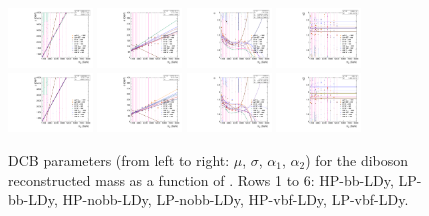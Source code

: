 \begin{figure}[htbp]
  \includegraphics[width=0.2\textwidth]{fig/analysisAppendix/paramSignalShape_allSig_MVV_HP_vbf_LDy_MEAN.pdf}
  \includegraphics[width=0.2\textwidth]{fig/analysisAppendix/paramSignalShape_allSig_MVV_HP_vbf_LDy_SIGMA.pdf}
  \includegraphics[width=0.2\textwidth]{fig/analysisAppendix/paramSignalShape_allSig_MVV_HP_vbf_LDy_ALPHA1.pdf}
  \includegraphics[width=0.2\textwidth]{fig/analysisAppendix/paramSignalShape_allSig_MVV_HP_vbf_LDy_ALPHA2.pdf}\\
  \includegraphics[width=0.2\textwidth]{fig/analysisAppendix/paramSignalShape_allSig_MVV_LP_vbf_LDy_MEAN.pdf}
  \includegraphics[width=0.2\textwidth]{fig/analysisAppendix/paramSignalShape_allSig_MVV_LP_vbf_LDy_SIGMA.pdf}
  \includegraphics[width=0.2\textwidth]{fig/analysisAppendix/paramSignalShape_allSig_MVV_LP_vbf_LDy_ALPHA1.pdf}
  \includegraphics[width=0.2\textwidth]{fig/analysisAppendix/paramSignalShape_allSig_MVV_LP_vbf_LDy_ALPHA2.pdf}\\
  \caption{
    DCB parameters (from left to right: $\mu$, $\sigma$, $\alpha_1$, $\alpha_2$) for the diboson reconstructed mass \MVV as a function of \MX.
    Rows 1 to 6: HP-bb-LDy, LP-bb-LDy, HP-nobb-LDy, LP-nobb-LDy, HP-vbf-LDy, LP-vbf-LDy.
  }
  \label{fig:MVVShapeParam_LDy}
\end{figure}

